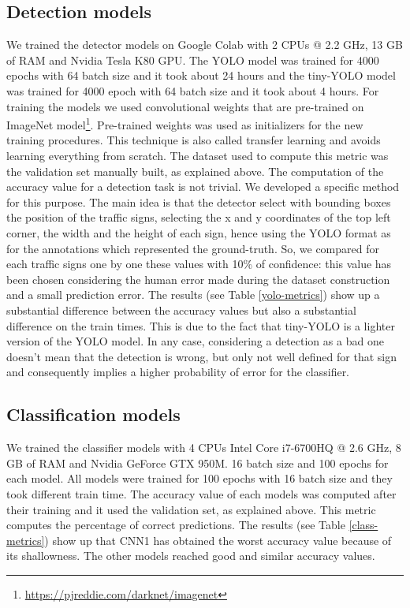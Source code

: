 \subsection{Detection models}
We trained the detector models on Google Colab with 2 CPUs @ 2.2 GHz, 13 GB of RAM and Nvidia Tesla K80 GPU. The YOLO model was trained for 4000 epochs with 64 batch size and it took about 24 hours and the tiny-YOLO model was trained for 4000 epoch with 64 batch size and it took about 4 hours.
For training  the models we used convolutional weights that are pre-trained on ImageNet model\footnote{\url{https://pjreddie.com/darknet/imagenet}}. Pre-trained weights was used as initializers for the new training procedures. This technique is also called transfer learning and avoids learning everything from scratch. The dataset used to compute this metric was the validation set manually built, as explained above. The computation of the accuracy value for a detection task is not trivial. We developed a specific method for this purpose. The main idea is that the detector select with bounding boxes the position of the traffic signs, selecting the x and y coordinates of the top left corner, the width and the height of each sign, hence using the YOLO format as for the annotations which represented the ground-truth. So, we compared for each traffic signs one by one these values with 10\% of confidence: this value has been chosen considering the human error made during the dataset construction and a small prediction error. 
The results (see Table \ref{yolo-metrics}) show up a substantial difference between the accuracy values but also a substantial difference on the train times. This is due to the fact that tiny-YOLO is a lighter version of the YOLO model. In any case, considering a detection as a bad one doesn't mean that the detection is wrong, but only not well defined for that sign and consequently implies a higher probability of error for the classifier.


\subsection{Classification models}
We trained the classifier models with 4 CPUs Intel Core i7-6700HQ @ 2.6 GHz, 8 GB of RAM and Nvidia GeForce GTX 950M. 16 batch size and 100 epochs for each model. All models were trained for 100 epochs with 16 batch size and they took different train time. The accuracy value of each models was computed after their training and it used the validation set, as explained above. This metric computes the percentage of correct predictions. The results (see Table \ref{class-metrics}) show up that CNN1 has obtained the worst accuracy value because of its shallowness. The other models reached good and similar accuracy values.



